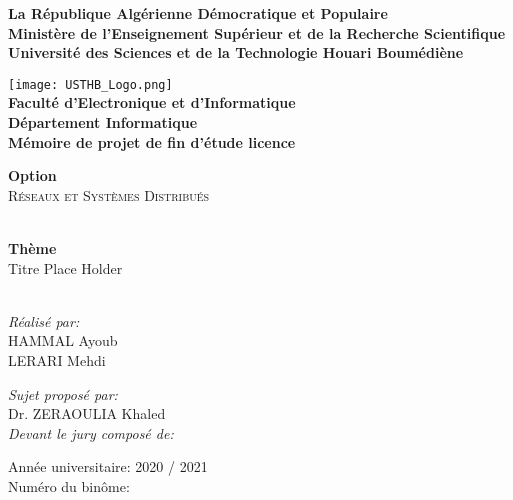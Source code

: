 \begin{titlepage}
\begin{center}

\textbf{
La République Algérienne Démocratique et Populaire\\[0.1cm]
Ministère de l'Enseignement Supérieur et de la Recherche Scientifique\\[0.1cm]
Université des Sciences et de la Technologie Houari Boumédiène\\[0.5cm]}

\texttt{[image: USTHB\_Logo.png]}\\[1cm]

{\Large \textbf{
Faculté d’Electronique et d’Informatique\\[0,1cm]
Département Informatique\\[0,1cm]
Mémoire de projet de fin d'étude licence\\[0.5cm]}}

{\Large \textbf{Option\\[0.5cm]}
\textsc{Réseaux et Systèmes Distribués\\}}

\HRule \\[0.4cm]
{\huge 
{\bfseries Thème}\\
Titre Place Holder\\[0.4cm]}
\HRule \\[1.5cm]

\normalsize
\begin{minipage}[t]{0.4\textwidth}
\begin{flushleft}
\large
\emph{Réalisé par:}\\
\textsc{HAMMAL} Ayoub\\
\textsc{LERARI} Mehdi
\end{flushleft}
\end{minipage}
%
\begin{minipage}[t]{0.4\textwidth}
\begin{flushright} 
\large
\emph{Sujet proposé par:}\\
Dr. \textsc{ZERAOULIA} Khaled\\[1.5cm]
\emph{Devant le jury composé de:}\\
\end{flushright}
\end{minipage}

\vfill

{\large Année universitaire: 2020 / 2021}\\
{\large Numéro du binôme: }

\end{center}
\end{titlepage}